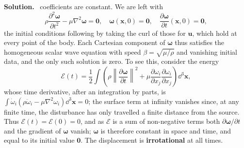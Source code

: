 \documentclass[a4paper,12pt]{paper}
\newenvironment{solution}{\par\noindent\textbf{Solution.}\ }{\par\medskip}
\begin{document}
\begin{solution}
coefficients are constant. We are left with
\begin{equation}
\rho\frac{\partial^{2}\bm{\omega}}{\partial t^{2}}-\mu\nabla^{2}\bm{\omega}=\mathbf{0},
\quad
\bm{\omega}(\mathbf{x},0)=\mathbf{0},\quad
\frac{\partial\bm{\omega}}{\partial t}(\mathbf{x},0)=\mathbf{0},
\label{eq:23}
\end{equation}
the initial conditions following by taking the curl of those for $\mathbf{u}$, which hold
at every point of the body. Each Cartesian component of $\bm{\omega}$ thus satisfies the
homogeneous scalar wave equation with speed $\beta=\sqrt{\mu/\rho}$ and vanishing initial
data, and the only such solution is zero. To see this, consider the energy
\begin{equation}
\mathcal{E}(t)=\frac{1}{2}\int\left(\rho\left\|\frac{\partial\bm{\omega}}{\partial t}\right\|^{2}
+\mu\frac{\partial\omega_{i}}{\partial x_{j}}\frac{\partial\omega_{i}}{\partial x_{j}}\right)\dd^{3}\mathbf{x},
\label{eq:24}
\end{equation}
whose time derivative, after an integration by parts, is
$\int\dot{\omega}_{i}\left(\rho\ddot{\omega}_{i}-\mu\nabla^{2}\omega_{i}\right)\dd^{3}\mathbf{x}=0$;
the surface term at infinity vanishes since, at any finite time, the disturbance has only
travelled a finite distance from the source. Thus $\mathcal{E}(t)=\mathcal{E}(0)=0$, and
as $\mathcal{E}$ is a sum of non-negative terms both $\partial\bm{\omega}/\partial t$ and
the gradient of $\bm{\omega}$ vanish; $\bm{\omega}$ is therefore constant in space and time,
and equal to its initial value $\mathbf{0}$. The displacement is \textbf{irrotational} at
all times.


\end{solution}
\end{document}
